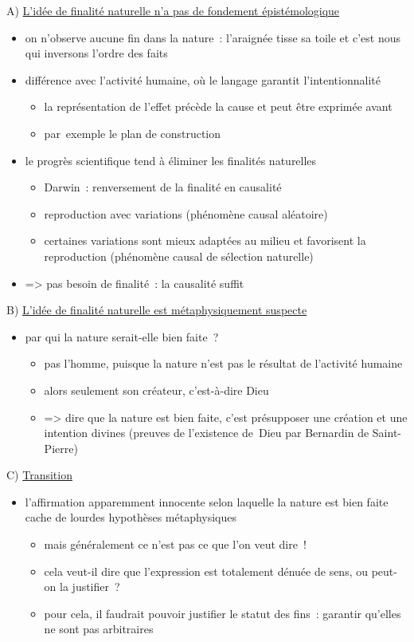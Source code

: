 \documentclass[a4paper,12pt]{article}
\begin{document}
\medskip

A) \uline{L'idée de finalité naturelle n'a pas de fondement épistémologique}
\begin{itemize}
\item on n'observe aucune fin dans la nature : l'araignée tisse sa toile et
c'est nous qui inversons l'ordre des faits
\item différence avec l'activité humaine, où le langage garantit
l'intentionnalité
\begin{itemize}
\item la représentation de l'effet précède la cause et peut être exprimée
avant
\item par exemple le plan de construction
\end{itemize}
\item le progrès scientifique tend à éliminer les finalités naturelles 
\begin{itemize}
\item Darwin : renversement de la finalité en causalité
\item reproduction avec variations (phénomène causal aléatoire)
\item certaines variations sont mieux adaptées au milieu et favorisent la
reproduction (phénomène causal de sélection naturelle)
\end{itemize}
\item => pas besoin de finalité : la causalité suffit
\end{itemize}

\medskip

B) \uline{L'idée de finalité naturelle est métaphysiquement suspecte} 
\begin{itemize}
\item par qui la nature serait-elle bien faite ?
\begin{itemize}
\item pas l'homme, puisque la nature n'est pas le résultat de l'activité
humaine
\item alors seulement son créateur, c'est-à-dire Dieu
\item => dire que la nature est bien faite, c'est présupposer une création
et une intention divines (preuves de l'existence de Dieu par
Bernardin de Saint-Pierre)
\end{itemize}
\end{itemize}

\medskip

C) \uline{Transition}
\begin{itemize}
\item l'affirmation apparemment innocente selon laquelle la nature est bien
faite cache de lourdes hypothèses métaphysiques
\begin{itemize}
\item mais généralement ce n'est pas ce que l'on veut dire !
\item cela veut-il dire que l'expression est totalement dénuée de sens, ou
peut-on la justifier ?
\item pour cela, il faudrait pouvoir justifier le statut des fins :
garantir qu'elles ne sont pas arbitraires
\end{itemize}
\end{itemize}
\end{document}
